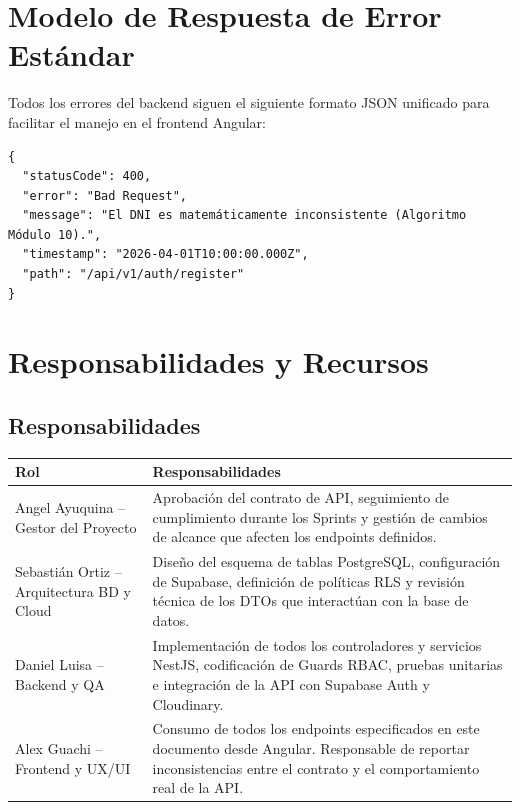 \documentclass[a4paper,12pt]{article}
\begin{document}
\section{Modelo de Respuesta de Error Estándar}

Todos los errores del backend siguen el siguiente formato JSON unificado para facilitar el manejo en el frontend Angular:

\begin{verbatim}
{
  "statusCode": 400,
  "error": "Bad Request",
  "message": "El DNI es matemáticamente inconsistente (Algoritmo Módulo 10).",
  "timestamp": "2026-04-01T10:00:00.000Z",
  "path": "/api/v1/auth/register"
}
\end{verbatim}

\section{Responsabilidades y Recursos}

\subsection{Responsabilidades}

\begin{table}[H]
\centering
\begin{tabular}{|p{4cm}|p{10cm}|}
\hline
\textbf{Rol} & \textbf{Responsabilidades} \\
\hline
Angel Ayuquina – Gestor del Proyecto &
Aprobación del contrato de API, seguimiento de cumplimiento durante los Sprints y gestión de cambios de alcance que afecten los endpoints definidos. \\
\hline
Sebastián Ortiz – Arquitectura BD y Cloud &
Diseño del esquema de tablas PostgreSQL, configuración de Supabase, definición de políticas RLS y revisión técnica de los DTOs que interactúan con la base de datos. \\
\hline
Daniel Luisa – Backend y QA &
Implementación de todos los controladores y servicios NestJS, codificación de Guards RBAC, pruebas unitarias e integración de la API con Supabase Auth y Cloudinary. \\
\hline
Alex Guachi – Frontend y UX/UI &
Consumo de todos los endpoints especificados en este documento desde Angular. Responsable de reportar inconsistencias entre el contrato y el comportamiento real de la API. \\
\hline
\end{tabular}
\end{table}
\end{document}
